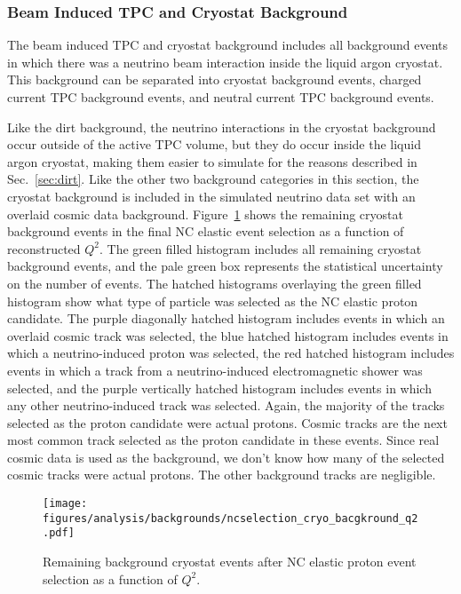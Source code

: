   \subsubsection{Beam Induced TPC and Cryostat Background}\label{sec:tpcbackgrounds}
    The beam induced TPC and cryostat background includes all background events
    in which there was a neutrino beam interaction inside the liquid argon
    cryostat. This background can be separated into cryostat background events,
    charged current TPC background events, and neutral current TPC background
    events.
    
    Like the dirt background, the neutrino interactions in the cryostat
    background occur outside of the active TPC volume, but they do occur inside
    the liquid argon cryostat, making them easier to simulate for the reasons
    described in Sec.~\ref{sec:dirt}. Like the other two background categories
    in this section, the cryostat background is included in the simulated
    neutrino data set with an overlaid cosmic data background.
    Figure~\ref{fig:selectedcryo} shows the remaining cryostat background
    events in the final NC elastic event selection as a function of
    reconstructed $Q^2$. The green filled histogram includes all remaining
    cryostat background events, and the pale green box represents the
    statistical uncertainty on the number of events. The hatched histograms
    overlaying the green filled histogram show what type of particle was
    selected as the NC elastic proton candidate. The purple diagonally hatched
    histogram includes events in which an overlaid cosmic track was selected,
    the blue hatched histogram includes events in which a neutrino-induced
    proton was selected, the red hatched histogram includes events in which a
    track from a neutrino-induced electromagnetic shower was selected, and the
    purple vertically hatched histogram includes events in which any other
    neutrino-induced track was selected. Again, the majority of the tracks
    selected as the proton candidate were actual protons. Cosmic tracks are the
    next most common track selected as the proton candidate in these events.
    Since real cosmic data is used as the background, we don't know how many of
    the selected cosmic tracks were actual protons. The other background tracks
    are negligible.
    \begin{figure}[ht]
      \centering
      \texttt{[image: figures/analysis/backgrounds/ncselection\_cryo\_bacgkround\_q2.pdf]}
      \caption{Remaining background cryostat events after NC elastic proton
      event selection as a function of $Q^2$.}
      \label{fig:selectedcryo}
    \end{figure}

